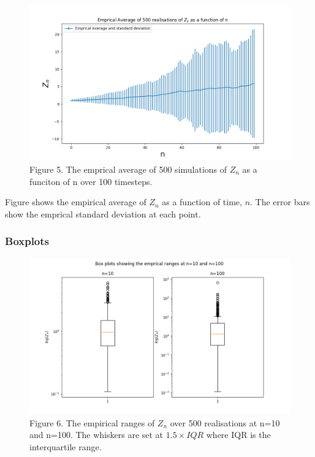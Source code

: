 \documentclass{article}
\begin{document}
\begin{figure}[H]
\includegraphics[scale=0.5]{empirical_average_1.png} 
\small{Figure 5. The emprical average of 500 simulations of $Z_n$ as a funciton of n over 100 timesteps. }
\end{figure}


Figure shows the empirical average of $Z_n$ as a function of time, $n$. The error bars show the emprical standard deviation at each point. 

\subsubsection{Boxplots}

\begin{figure}[H]
\includegraphics[scale=0.5]{box_plots_a.png} 
\small{Figure 6. The empirical ranges of $Z_n$ over 500 realisations at n=10 and n=100. The whiskers are set at $1.5 \times IQR$ where IQR is the interquartile range.}
\end{figure}
\end{document}
